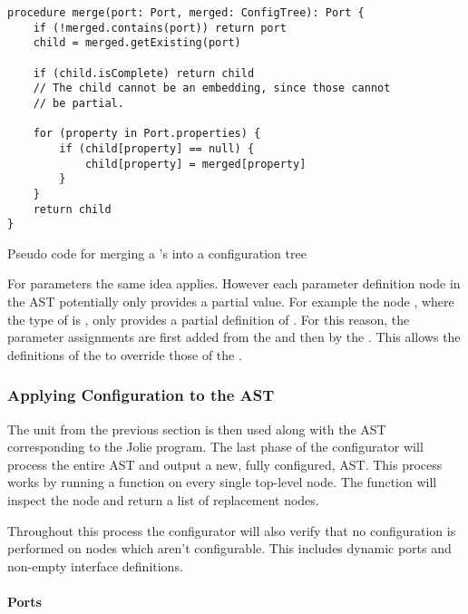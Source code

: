 \begin{listing}[H]
\begin{verbatim}
procedure merge(port: Port, merged: ConfigTree): Port {
    if (!merged.contains(port)) return port
    child = merged.getExisting(port)

    if (child.isComplete) return child
    // The child cannot be an embedding, since those cannot
    // be partial.

    for (property in Port.properties) {
        if (child[property] == null) {
            child[property] = merged[property]
        }
    }
    return child
}
\end{verbatim}

\caption{Pseudo code for merging a 's  into a
     configuration tree}

\label{lst:merge_ports}

\end{listing}

For parameters the same idea applies. However each parameter definition node in
the AST potentially only provides a partial value. For example the node
, where the type of  is , only provides a partial definition of . For this
    reason, the parameter assignments are first added from the 
    and then by the . This allows the definitions of the
     to override those of the .

\subsubsection*{Applying Configuration to the AST}

The  unit from the previous section is then used along with the
AST corresponding to the Jolie program. The last phase of the configurator will
process the entire AST and output a new, fully configured, AST. This process
works by running a  function on every single top-level node. The
 function will inspect the node and return a list of replacement
nodes.

Throughout this process the configurator will also verify that no configuration
is performed on nodes which aren't configurable. This includes dynamic ports
and non-empty interface definitions.

\paragraph{Ports}

